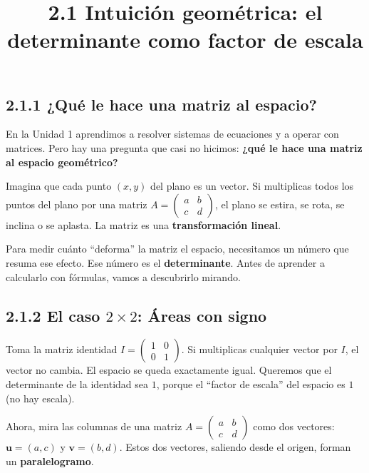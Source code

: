 \documentclass[
  letterpaper,
  DIV=11,
  numbers=noendperiod]{scrartcl}
\title{2.1 Intuición geométrica: el determinante como factor de escala}
\author{}
\date{}
\begin{document}
\maketitle


\subsection{2.1.1 ¿Qué le hace una matriz al
espacio?}\label{quuxe9-le-hace-una-matriz-al-espacio}

En la Unidad 1 aprendimos a resolver sistemas de ecuaciones y a operar
con matrices. Pero hay una pregunta que casi no hicimos: \textbf{¿qué le
hace una matriz al espacio geométrico?}

Imagina que cada punto \((x, y)\) del plano es un vector. Si multiplicas
todos los puntos del plano por una matriz
\(A = \begin{pmatrix} a & b \\ c & d \end{pmatrix}\), el plano se
estira, se rota, se inclina o se aplasta. La matriz es una
\textbf{transformación lineal}.

Para medir cuánto ``deforma'' la matriz el espacio, necesitamos un
número que resuma ese efecto. Ese número es el \textbf{determinante}.
Antes de aprender a calcularlo con fórmulas, vamos a descubrirlo
mirando.

\subsection{\texorpdfstring{2.1.2 El caso \(2 \times 2\): Áreas con
signo}{2.1.2 El caso 2 \textbackslash times 2: Áreas con signo}}\label{el-caso-2-times-2-uxe1reas-con-signo}

Toma la matriz identidad
\(I = \begin{pmatrix} 1 & 0 \\ 0 & 1 \end{pmatrix}\). Si multiplicas
cualquier vector por \(I\), el vector no cambia. El espacio se queda
exactamente igual. Queremos que el determinante de la identidad sea
\(1\), porque el ``factor de escala'' del espacio es \(1\) (no hay
escala).

Ahora, mira las columnas de una matriz
\(A = \begin{pmatrix} a & b \\ c & d \end{pmatrix}\) como dos vectores:
\(\mathbf{u} = (a, c)\) y \(\mathbf{v} = (b, d)\). Estos dos vectores,
saliendo desde el origen, forman un \textbf{paralelogramo}.
\end{document}
